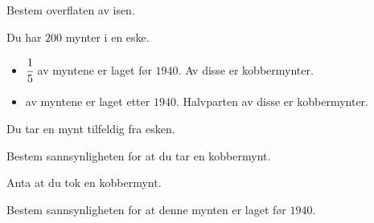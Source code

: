 \begin{oppgaver}
   Bestem overflaten av isen.
\end{oppgaver}


\Oppgave[4]

Du har $200$ mynter i en eske.

\begin{itemize}
  \item $\cfrac{1}{5}$ av myntene er laget før $1940$. Av disse er
    kobbermynter.
  \item av myntene er laget etter $1940$. Halvparten av disse er kobbermynter.
\end{itemize}

Du tar en mynt tilfeldig fra esken.

\begin{oppgaver}
   Bestem sannsynligheten for at du tar en kobbermynt.
\end{oppgaver}

Anta at du tok en kobbermynt.

\begin{oppgaver}
   Bestem sannsynligheten for at denne mynten er laget før $1940$.
\end{oppgaver}


\Oppgave[4] %

